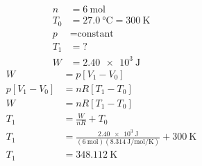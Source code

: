 \documentclass{article}
\begin{document}
\begin{align*}
	n & = \SI{6}{\mole} \\
	T_0 & = \SI{27.0}{\celsius} = \SI{300}{\kelvin} \\
	p & = \text{constant} \\
	T_1 & = ? \\
	W & = \SI{2.40e3}{\joule}
\end{align*}
\begin{align*}
	W & = p \left[ V_1 - V_0 \right] \\
	p \left[ V_1 - V_0 \right] & = nR \left[ T_1 - T_0 \right] \\
	W & = nR \left[ T_1 - T_0 \right] \\
	T_1 & = \frac{ W }{ nR } + T_0 \\
	T_1 & = \frac{ \SI{2.40e3}{\joule} }{ (\SI{6}{\mole})(\SI{8.314}{\joule \per \mole \per \kelvin}) } + \SI{300}{\kelvin} \\
	T_1 & = \SI{348.112}{\kelvin}
\end{align*}
\end{document}
